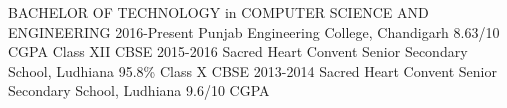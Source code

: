    
\begin{entrylist}
\entry
{BACHELOR OF TECHNOLOGY {\normalfont in COMPUTER SCIENCE AND ENGINEERING }}
{2016-Present}
{Punjab Engineering College, Chandigarh}
{8.63/10 CGPA}
\entry
{Class XII {\normalfont CBSE}}
{2015-2016}
{Sacred Heart Convent Senior Secondary School, Ludhiana}
{95.8\%}
\entry
{Class X {\normalfont CBSE}}
{2013-2014}
{Sacred Heart Convent Senior Secondary School, Ludhiana}
{9.6/10 CGPA}

\end{entrylist}